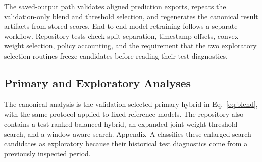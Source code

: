 The saved-output path validates aligned prediction exports, repeats the validation-only blend and threshold selection, and regenerates the canonical result artifacts from stored scores. End-to-end model retraining follows a separate workflow. Repository tests check split separation, timestamp offsets, convex-weight selection, policy accounting, and the requirement that the two exploratory selection routines freeze candidates before reading their test diagnostics.

\subsection{Primary and Exploratory Analyses}

The canonical analysis is the validation-selected primary hybrid in Eq.~\eqref{eq:blend}, with the same protocol applied to fixed reference models. The repository also contains a test-ranked balanced hybrid, an expanded joint weight-threshold search, and a window-aware search. Appendix~A classifies these enlarged-search candidates as exploratory because their historical test diagnostics come from a previously inspected period.
